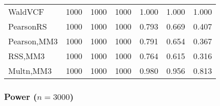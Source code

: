 \documentclass[
]{article}
\begin{document}
\begin{table}[H]
{\begin{tabular}[t]{lrrrrrr}
\hspace{1em}WaldVCF & 1000 & 1000 & 1000 & 1.000 & 1.000 & 1.000\\
\hspace{1em}PearsonRS & 1000 & 1000 & 1000 & 0.793 & 0.669 & 0.407\\
\hspace{1em}Pearson,MM3 & 1000 & 1000 & 1000 & 0.791 & 0.654 & 0.367\\
\hspace{1em}RSS,MM3 & 1000 & 1000 & 1000 & 0.764 & 0.615 & 0.316\\
\hspace{1em}Multn,MM3 & 1000 & 1000 & 1000 & 0.980 & 0.956 & 0.813\\
\bottomrule
\end{tabular}}
\endgroup{}
\end{table}

\hypertarget{power-n3000-2}{%
\subsubsection{\texorpdfstring{Power
(\(n=3000\))}{Power (n=3000)}}\label{power-n3000-2}}
\end{document}

